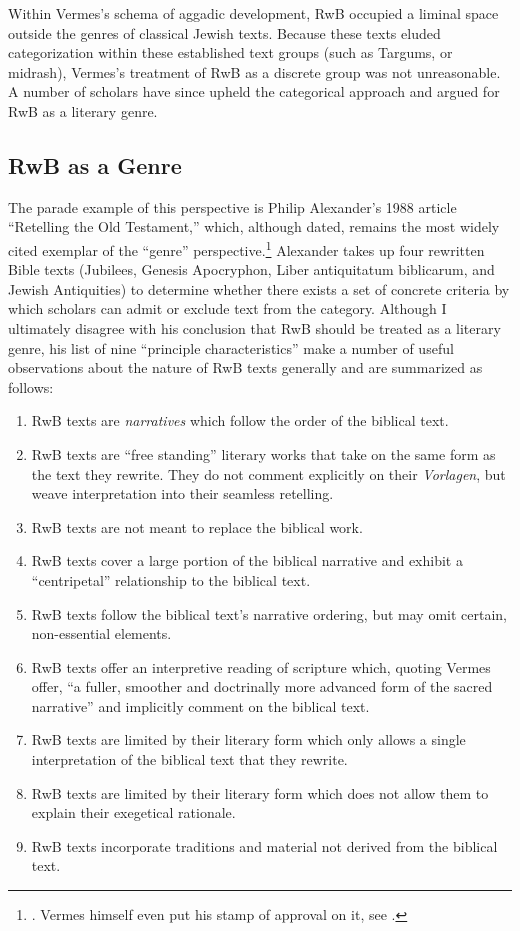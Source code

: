 Within Vermes's schema of aggadic development, RwB occupied a liminal
space outside the genres of classical Jewish texts. Because these texts
eluded categorization within these established text groups (such as
Targums, or midrash), Vermes's treatment of RwB as a discrete group was
not unreasonable. A number of scholars have since upheld the categorical
approach and argued for RwB as a literary genre.

\subsection{RwB as a Genre}\label{rwb-as-a-genre}

The parade example of this perspective is Philip Alexander's 1988
article ``Retelling the Old Testament,'' which, although dated, remains
the most widely cited exemplar of the ``genre'' perspective.\footnote{\textcite{alexander_carson-williamson1988}.
  Vermes himself even put his stamp of approval on it, see
  \textcite[4]{vermes_zsengeller2014}.} Alexander takes up four
rewritten Bible texts (Jubilees, Genesis Apocryphon,
Liber antiquitatum biblicarum, and Jewish Antiquities) to determine
whether there exists a set of concrete criteria by which scholars can
admit or exclude text from the category. Although I ultimately disagree
with his conclusion that RwB should be treated as a literary genre, his
list of nine ``principle characteristics'' make a number of useful
observations about the nature of RwB texts generally and are summarized
as follows:

\begin{enumerate}
\def\labelenumi{\arabic{enumi}.}
\tightlist
\item
  RwB texts are \emph{narratives} which follow the order of the biblical
  text.
\item
  RwB texts are ``free standing'' literary works that take on the same
  form as the text they rewrite. They do not comment explicitly on their
  \emph{Vorlagen}, but weave interpretation into their seamless
  retelling.
\item
  RwB texts are not meant to replace the biblical work.
\item
  RwB texts cover a large portion of the biblical narrative and exhibit
  a ``centripetal'' relationship to the biblical text.
\item
  RwB texts follow the biblical text's narrative ordering, but may omit
  certain, non-essential elements.
\item
  RwB texts offer an interpretive reading of scripture which, quoting
  Vermes offer, ``a fuller, smoother and doctrinally more advanced form
  of the sacred narrative''\autocite[Citing Vermes in][305]{schurer1986}
  and implicitly comment on the biblical text.
\item
  RwB texts are limited by their literary form which only allows a
  single interpretation of the biblical text that they rewrite.
\item
  RwB texts are limited by their literary form which does not allow them
  to explain their exegetical rationale.
\item
  RwB texts incorporate traditions and material not derived from the
  biblical text.
\end{enumerate}

